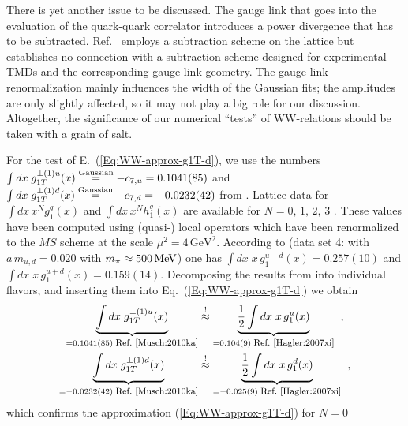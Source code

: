 \documentclass[a4paper,11pt]{article}
\newcommand{\ba}{\begin{eqnarray}}
\newcommand{\ea}{\end{eqnarray}}
\begin{document}
There is yet another issue to be discussed. 
The gauge link that goes into the evaluation of the quark-quark correlator 
introduces a power divergence that has to be subtracted. 
Ref.~\cite{Musch:2010ka} employs a subtraction scheme on the lattice
but establishes no connection with a subtraction scheme designed for 
experimental TMDs and the corresponding gauge-link geometry. 
The gauge-link renormalization mainly 
influences the width of the Gaussian fits; the amplitudes are only slightly 
affected, so it may not play a big role for our discussion. Altogether, the 
significance of our numerical ``tests'' of WW-relations should be taken 
with a grain of salt.

For the test of E.~(\ref{Eq:WW-approx-g1T-d}), we use the numbers 
$\int d x\;g_{1T}^{\perp(1)u}(x)\stackrel{\text{\scriptsize Gaussian}}{=}
-c_{7,u}= 0.1041(85)$ and
$\int d x\;g_{1T}^{\perp(1)d}(x)\stackrel{\text{\scriptsize Gaussian}}{=}
-c_{7,d}=-0.0232(42)$
from \cite{Musch:2010ka}. %
Lattice data for
$\int d x \,x^{N}g_1^q(x)$
\cite{Hagler:2003is,Hagler:2007xi} and
$\int d x \,x^{N}h_1^q(x)$
\cite{Gockeler:2005cj} are available for $N=0,\,1,\,2,\,3$ .
These values have been computed using (quasi-) local operators which 
have been renormalized to the $\overline{MS}$ scheme at the scale 
$\mu^2 = 4\,\text{GeV}^2$.
According to \cite{Hagler:2007xi} (data set 4:
with $a\,m_{u,d} = 0.020$ with $m_\pi\approx 500\,{\rm MeV}$)
one has $\int d x \;x\,g_1^{u-d}(x)= 0.257(10)$ and
$\int d x \;x\,g_1^{u+d}(x)= 0.159(14)$.
Decomposing the results from  \cite{Hagler:2007xi} into
individual flavors, and inserting them into
Eq.~(\ref{Eq:WW-approx-g1T-d}) we obtain
\ba
        \underbrace{\int d x\;g_{1T}^{\perp(1)u}(x)}
        _{= 0.1041(85) \;\mbox{\footnotesize Ref.~\cite{Musch:2010ka}}}
        &\stackrel{!}{\approx}
        \underbrace{\frac{1}{2}\int d x\;x\,g_1^u(x)}
        _{= 0.104(9) \;\mbox{\footnotesize Ref.~\cite{Hagler:2007xi}}}
        \hspace{2mm} , \nonumber \\
        \underbrace{\int d x\;g_{1T}^{\perp(1)d}(x)}
        _{= -0.0232(42) \;\mbox{\footnotesize Ref.~\cite{Musch:2010ka}}}
        &\stackrel{!}{\approx}
        \underbrace{\frac{1}{2}\int d x\;x\,g_1^d(x)}
        _{= -0.025(9) \;\mbox{\footnotesize Ref.~\cite{Hagler:2007xi}}}
        \hspace{2mm}, 
        \label{Eq:test-WW-type-lattice-g1T}
\ea
which confirms the approximation (\ref{Eq:WW-approx-g1T-d}) for $N=0$
\end{document}
